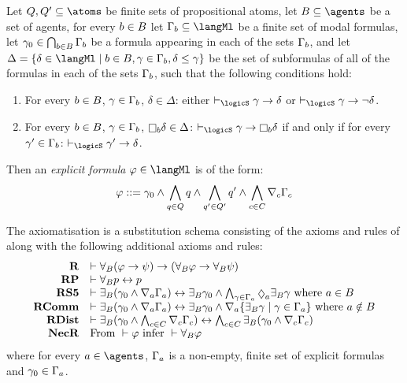 \begin{definition}
Let $\atomsQ, \atomsQ' \subseteq \atoms$ be finite sets of propositional atoms,
let $\agentsB \subseteq \agents$ be a set of agents,
for every $b \in B$ let $\Gamma_\agentB \subseteq \langMl$ be a finite set of modal formulas,
let $\gamma_0 \in \bigcap_{b \in B} \Gamma_b$ be a formula appearing in each of the sets $\Gamma_b$, and
let $\Delta = \{\delta \in \langMl \mid \agentB \in \agentsB, \gamma \in \Gamma_\agentB, \delta \leq \gamma\}$ be the set of subformulas of all of the formulas in each of the sets $\Gamma_b$,
such that the following conditions hold:
\begin{enumerate}
    \item For every $b \in B$, $\gamma \in \Gamma_b$, $\delta \in \Delta$: either $\proves_\logicS \gamma \implies \delta$ or $\proves_\logicS \gamma \implies \lnot \delta$.
    \item For every $b \in B$, $\gamma \in \Gamma_b$, $\necessaryB \delta \in \Delta$: $\proves_\logicS \gamma \implies \necessaryB \delta$ if and only if for every $\gamma' \in \Gamma_b$: $\proves_\logicS \gamma' \implies \delta$.
\end{enumerate}
Then an {\em explicit formula} $\phi \in \langMl$ is of the form:
$$
\varphi ::= \gamma_0 \land \bigwedge_{q \in Q} q \land \bigwedge_{q' \in Q'} q' \land \bigwedge_{c \in C} \nabla_{c} \Gamma_c
$$
\end{definition}

\begin{definition}
    The axiomatisation \axiomRmlS{} is a substitution schema consisting of the axioms and rules of \axiomS{} along with the following additional axioms and rules:
$$
\begin{array}{rl}
    {\bf R} & \proves \allrefsBs (\phi \implies \psi) \implies (\allrefsBs \phi \implies \allrefsBs \psi)\\
    {\bf RP} & \proves \allrefsBs \atomP \iff \atomP\\
    {\bf RS5} & \proves \somerefsBs (\gamma_0 \land \coversA \Gamma_\agentA) \iff \somerefsBs \gamma_0 \land \bigwedge_{\gamma \in \Gamma_\agentA} \possibleA \somerefsBs \gamma \text{ where } \agentA \in \agentsB\\
    {\bf RComm} & \proves \somerefsBs (\gamma_0 \land \coversA \Gamma_\agentA) \iff \somerefsBs \gamma_0 \land \coversA \{\somerefsBs \gamma \mid \gamma \in \Gamma_\agentA\} \text{ where } \agentA \notin \agentsB\\
    {\bf RDist} & \proves \somerefsBs (\gamma_0 \land \bigwedge_{\agentC \in \agentsC} \coversC \Gamma_\agentC) \iff \bigwedge_{\agentC \in \agentsC} \somerefsBs (\gamma_0 \land \coversC \Gamma_\agentC)\\
    {\bf NecR} & \text{From } \proves \phi \text{ infer } \proves \allrefsBs \phi
\end{array}
$$
where for every $\agentA \in \agents$, $\Gamma_a$ is a non-empty, finite set of explicit formulas and $\gamma_0 \in \Gamma_a$.
\end{definition}

